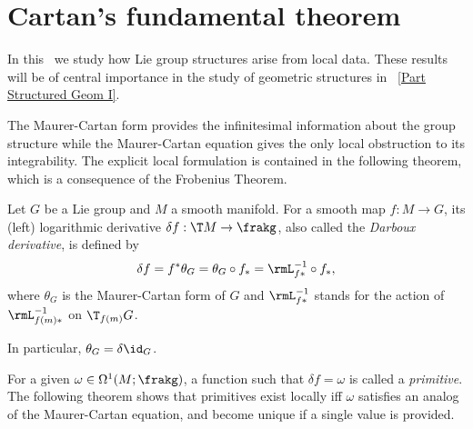 \section{Cartan's fundamental theorem}\label{sec: Cartan's fundamental}

In this \sect\ we study how Lie group structures arise from local data. These results will be of central importance in the study of geometric structures in \Part\ \ref{Part Structured Geom I}.

The Maurer-Cartan form provides the infinitesimal information about the group structure while the Maurer-Cartan equation gives the only local obstruction to its integrability. The explicit local formulation is contained in the following theorem, which is a consequence of the Frobenius Theorem.

\begin{defn}
    Let $G$ be a Lie group and $M$ a smooth manifold. For a smooth map $f:M\to G$, its (left) logarithmic derivative $\delta f:\T M\to \frakg$, also called the \emph{Darboux derivative}, is defined by
    \[\delta f=f^\ast\theta_G=\theta_G\circ f_\ast=\rmL_{f\ast}^{-1}\circ f_\ast,\]
    where $\theta_G$ is the Maurer-Cartan form of $G$ and $\rmL_{f\ast}^{-1}$ stands for the action of $\rmL_{f(m)\ast}^{-1}$ on $\T_{f(m)}G$.
    
    In particular, $\theta_G=\delta\id_G$.
\end{defn}

For a given $\omega\in \Omega^1(M;\frakg)$, a function such that $\delta f=\omega$ is called a \emph{primitive}. The following theorem shows that primitives exist locally iff $\omega$ satisfies an analog of the Maurer-Cartan equation, and become unique if a single value is provided.

